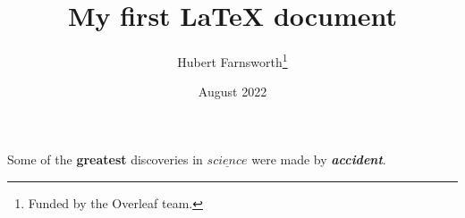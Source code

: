 \documentclass[12pt, letterpaper]{article}
\title{My first LaTeX document}
\author{Hubert Farnsworth\thanks{Funded by the Overleaf team.}}
\date{August 2022}
\begin{document}
	\maketitle
	Some of the \textbf{greatest} discoveries in $\underline{science}$ were made by \textbf{\textit{accident}}.
\end{document}
